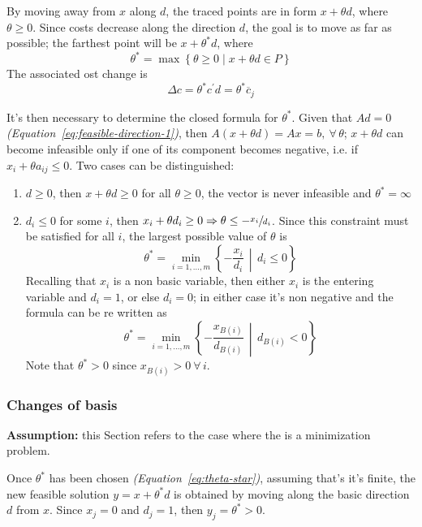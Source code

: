 \documentclass[english]{article}
\begin{document}
By moving away from \(x\) along \(d\), the traced points are in form \(x + \theta d\), where \(\theta \geq 0\).
Since costs decrease along the direction \(d\), the goal is to move as far as possible;
the farthest point will be \(x + \theta^\ast d\), where
\[ \theta^\ast = \max \left\{ \theta \geq 0 \mid x + \theta d \in P \right\}\]
The associated ost change is
\[ \Delta c = \theta^\ast c^\prime d = \theta^\ast \overline{c}_j \]

\bigskip
It's then necessary to determine the closed formula for \(\theta^\ast\).
Given that \(A d = 0\) \textit{(Equation~\ref{eq:feasible-direction-1})}, then \(A \left( x + \theta d \right) = Ax = b, \ \forall \, \theta\);
\(x + \theta d\) can become infeasible only if one of its component becomes negative, i.e. if \(x_i + \theta a_{ij} \leq 0\).
Two cases can be distinguished:

\begin{enumerate}
  \item \(d \geq 0\), then \(x + \theta d \geq 0\) for all \(\theta \geq 0\), the vector is never infeasible and \(\theta^\ast = \infty\)
  \item \(d_i \leq 0\) for some \(i\), then \(x_i + \theta d_i \geq 0 \Rightarrow \theta \leq -\sfrac{x_i}{d_i}\).
        Since this constraint must be satisfied for all \(i\), the largest possible value of \(\theta\) is
        \[ \theta^\ast = \min_{i=1, \ldots, m} \left\{ -\dfrac{x_i}{d_i} \,\middle\vert\, d_i \leq 0 \right\} \]
        Recalling that \(x_i\) is a non basic variable, then either \(x_i\) is the entering variable and \(d_i = 1\), or else \(d_i = 0\);
        in either case it's non negative and the formula can be re written as
        \begin{equation}
          \theta^\ast = \min_{i=1, \ldots, m} \left\{ - \dfrac{x_{B(i)}}{d_{B(i)}} \,\middle\vert\, d_{B(i)} < 0 \right\}
          \label{eq:theta-star}
        \end{equation}
        Note that \(\theta^\ast > 0\) since \(x_{B(i)} > 0 \ \forall \, i\).
\end{enumerate}

\subsubsection{Changes of basis}

\textbf{Assumption:} this Section refers to the case where the \LP is a minimization problem.

\bigskip
Once \(\theta^\ast\) has been chosen \textit{(Equation~\ref{eq:theta-star})}, assuming that's it's finite, the new feasible solution \(y= x + \theta^\ast d\) is obtained by moving along the basic direction \(d\) from \(x\).
Since \(x_j=0\) and \(d_j=1\), then \(y_j = \theta^\ast > 0\).
\end{document}
